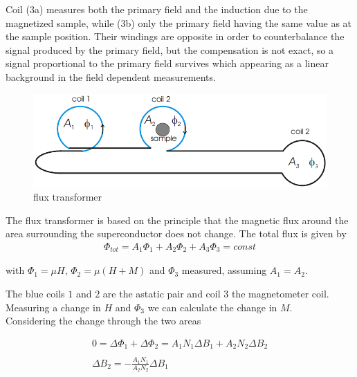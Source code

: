 \documentclass[openany,11pt,a4paper]{report}
\begin{document}
Coil (3a) measures both the
primary field and the induction due to the magnetized sample, while (3b) only the primary field having the same value as at the sample position. Their  windings are opposite in
order to counterbalance the signal produced by the primary field, but the compensation is not exact, so a signal proportional to the primary field survives which appearing as a linear background in the field dependent measurements.


\begin{figure}[hbtp]
\centering
\includegraphics[scale=0.6]{fluxtrans.PNG}
\caption{flux transformer}
\end{figure}



The flux transformer is based on the principle that the magnetic flux around the area surrounding the superconductor does not change. The total flux is given by
\begin{equation}
\begin{array}{c}{\Phi _{tot}= A_{1} \Phi_{1} +A_{2} \Phi _{2} + A_{3} \Phi _{3}= const
}\end{array}
\end{equation}

with $\Phi _{1}= \mu H$, $\Phi_{2}=\mu (H+M)$ and $\Phi _{3}$ measured, assuming $A_{1}=A_{2}$.

The blue coils $1$ and $2$ are the astatic pair and coil $3$ the magnetometer coil.\\

Measuring a change in $H$ and ${\Phi} _{3}$ we can calculate the change in $M$.\\

Considering the change through the two areas

\begin{equation}
         \begin{array}{c}{   0 =\Delta \Phi_{1}+\Delta \Phi_{2}=A_{1} N_{1} \Delta B_{1}+A_{2} N_{2} \Delta B_{2}} \\  \\ {\Delta B_{2}=-\frac{A_{1} N_{1}}{A_{2} N_{2}} \Delta B_{1}}\end{array}
\end{equation}
\end{document}
